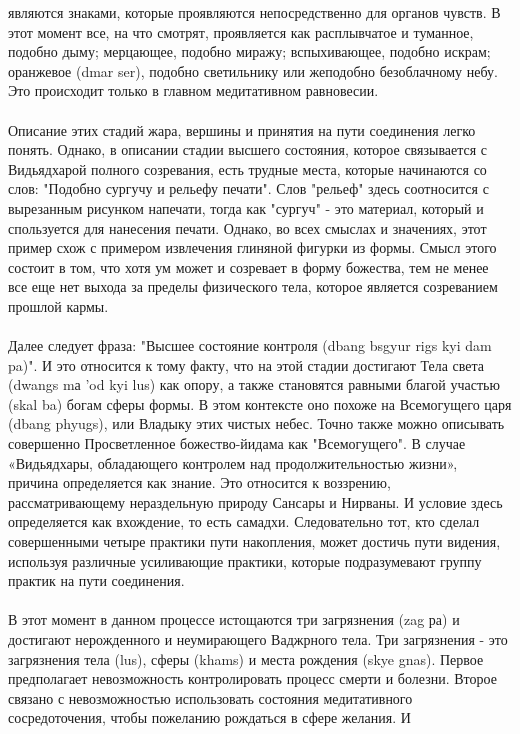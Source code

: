 \begin{siderules}
являются знаками, которые проявляются непосредственно для органов чувств. В этот момент
все, на что смотрят, проявляется как расплывчатое и туманное, подобно дыму; мерцающее,
подобно миражу; вспыхивающее, подобно искрам; оранжевое (dmar ser), подобно
светильнику или жеподобно безоблачному небу. Это происходит только в главном
медитативном равновесии.\\
\\
Описание этих стадий жара, вершины и принятия на пути соединения легко понять. Однако,
в описании стадии высшего состояния, которое связывается с Видьядхарой полного
созревания, есть трудные места, которые начинаются со слов: "Подобно сургучу и рельефу
печати". Слов "рельеф" здесь соотносится с вырезанным рисунком напечати, тогда как
"сургуч" - это материал, который и спользуется для нанесения печати. Однако, во всех
смыслах и значениях, этот пример схож с примером извлечения глиняной фигурки из
формы. Смысл этого состоит в том, что хотя ум может и созревает в форму божества, тем не
менее все еще нет выхода за пределы физического тела, которое является созреванием
прошлой кармы.\\
\\
Далее следует фраза: "Высшее состояние контроля (dbang bsgyur rigs kyi dam pa)". И это
относится к тому факту, что на этой стадии достигают Тела света (dwangs mа 'od kyi lus) как
опору, а также становятся равными благой участью (skal ba) богам сферы формы. В этом
контексте оно похоже на Всемогущего царя (dbang phyugs), или Владыку этих чистых небес.
Точно также можно описывать совершенно Просветленное божество-йидама как "Всемогущего".
В случае «Видьядхары, обладающего контролем над продолжительностью жизни», причина
определяется как знание. Это относится к воззрению, рассматривающему нераздельную
природу Сансары и Нирваны. И условие здесь определяется как вхождение, то есть самадхи.
Следовательно тот, кто сделал совершенными четыре практики пути накопления, может
достичь пути видения, используя различные усиливающие практики, которые
подразумевают группу практик на пути соединения. \\
\\
В этот момент в данном процессе истощаются три загрязнения (zag ра) и достигают
нерожденного и неумирающего Ваджрного тела. Три загрязнения - это загрязнения тела (lus),
сферы (khams) и места рождения (skye gnas). Первое предполагает невозможность
контролировать процесс смерти и болезни. Второе связано с невозможностью использовать
состояния медитативного сосредоточения, чтобы пожеланию рождаться в сфере желания. И

\end{siderules}
